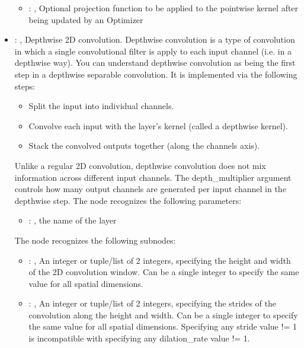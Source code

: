 \begin{itemize}
\begin{itemize}
        \item {}: , 
          Optional projection function to be applied to the pointwise kernel after being updated by
          an Optimizer
      \end{itemize}

    \item {}: , 
      Depthwise 2D convolution. Depthwise convolution is a type of convolution in which a single
      convolutional filter is apply to each input channel (i.e. in a depthwise way). You can
      understand depthwise         convolution as being the first step in a depthwise separable
      convolution.         It is implemented via the following steps:         \begin{itemize}
      \item Split the input into individual channels.           \item Convolve each input with the
      layer's kernel (called a depthwise kernel).           \item Stack the convolved outputs
      together (along the channels axis).         \end{itemize}         Unlike a regular 2D
      convolution, depthwise convolution does not mix information across different input channels.
      The depth\_multiplier argument controls how many output channels are generated per input
      channel in the         depthwise step.
      The  node recognizes the following parameters:
        \begin{itemize}
          \item {}: , 
            the name of the layer
      \end{itemize}

      The  node recognizes the following subnodes:
      \begin{itemize}
        \item {}: , 
          An integer or tuple/list of 2 integers, specifying the height and width of the 2D
          convolution window.         Can be a single integer to specify the same value for all
          spatial dimensions.

        \item {}: , 
          An integer or tuple/list of 2 integers, specifying the strides of the convolution along
          the height         and width. Can be a single integer to specify the same value for all
          spatial dimensions. Specifying any         stride value != 1 is incompatible with
          specifying any dilation\_rate value != 1.


\end{itemize}
\end{itemize}
